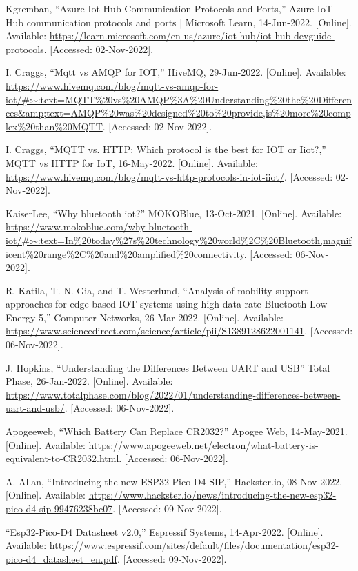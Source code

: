 \begin{thebibliography}{00}
     Kgremban, “Azure Iot Hub Communication Protocols and Ports,” Azure IoT Hub communication protocols and ports | Microsoft Learn, 14-Jun-2022. [Online]. Available: \url{https://learn.microsoft.com/en-us/azure/iot-hub/iot-hub-devguide-protocols}. [Accessed: 02-Nov-2022]. 

     I. Craggs, “Mqtt vs AMQP for IOT,” HiveMQ, 29-Jun-2022. [Online]. Available: \url{https://www.hivemq.com/blog/mqtt-vs-amqp-for-iot/#:~:text=MQTT%20vs%20AMQP%3A%20Understanding%20the%20Differences&amp;text=AMQP%20was%20designed%20to%20provide,is%20more%20complex%20than%20MQTT}. [Accessed: 02-Nov-2022]. 
    
     I. Craggs, “MQTT vs. HTTP: Which protocol is the best for IOT or Iiot?,” MQTT vs HTTP for IoT, 16-May-2022. [Online]. Available: \url{https://www.hivemq.com/blog/mqtt-vs-http-protocols-in-iot-iiot/}. [Accessed: 02-Nov-2022]. 
    
     KaiserLee, “Why bluetooth iot?” MOKOBlue, 13-Oct-2021. [Online]. Available: \url{https://www.mokoblue.com/why-bluetooth-iot/#:~:text=In%20today%27s%20technology%20world%2C%20Bluetooth,magnificent%20range%2C%20and%20amplified%20connectivity}. [Accessed: 06-Nov-2022]. 
    
     R. Katila, T. N. Gia, and T. Westerlund, “Analysis of mobility support approaches for edge-based IOT systems using high data rate Bluetooth Low Energy 5,” Computer Networks, 26-Mar-2022. [Online]. Available: \url{https://www.sciencedirect.com/science/article/pii/S1389128622001141}. [Accessed: 06-Nov-2022].
    
     J. Hopkins, “Understanding the Differences Between UART and USB” Total Phase, 26-Jan-2022. [Online]. Available: \url{https://www.totalphase.com/blog/2022/01/understanding-differences-between-uart-and-usb/}. [Accessed: 06-Nov-2022].

     Apogeeweb, “Which Battery Can Replace CR2032?” Apogee Web, 14-May-2021. [Online]. Available: \url{https://www.apogeeweb.net/electron/what-battery-is-equivalent-to-CR2032.html}. [Accessed: 06-Nov-2022].
    
     A. Allan, “Introducing the new ESP32-Pico-D4 SIP,” Hackster.io, 08-Nov-2022. [Online]. Available: \url{https://www.hackster.io/news/introducing-the-new-esp32-pico-d4-sip-99476238bc07}. [Accessed: 09-Nov-2022]. 
    
    “Esp32-Pico-D4 Datasheet v2.0,” Espressif Systems, 14-Apr-2022. [Online]. Available: \url{https://www.espressif.com/sites/default/files/documentation/esp32-pico-d4_datasheet_en.pdf}. [Accessed: 09-Nov-2022]. 
\end{thebibliography}